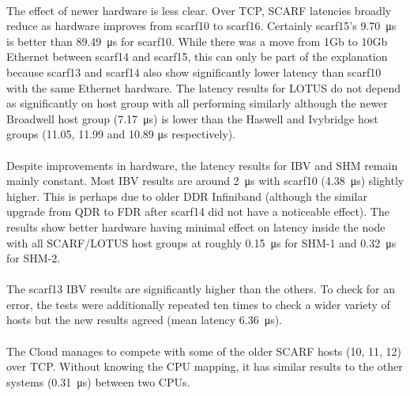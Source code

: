 \documentclass{article}
\begin{document}
            \paragraph{}
            The effect of newer hardware is less clear. Over TCP, SCARF latencies broadly reduce as hardware improves from scarf10 to scarf16. Certainly scarf15's \SI{9.70}{\micro\second} is better than \SI{89.49}{\micro\second} for scarf10. While there was a move from 1Gb to 10Gb Ethernet between scarf14 and scarf15, this can only be part of the explanation because scarf13 and scarf14 also show significantly lower latency than scarf10 with the same Ethernet hardware. The latency results for LOTUS do not depend as significantly on host group with all performing similarly although the newer Broadwell host group (\SI{7.17}{\micro\second}) is lower than the Haswell and Ivybridge host groups (11.05, 11.99 and 10.89 \si{\micro\second} respectively).

            \paragraph{}
            Despite improvements in hardware, the latency results for IBV and SHM remain mainly constant. Most IBV results are around \SI{2}{\micro\second} with scarf10 (\SI{4.38}{\micro\second}) slightly higher. This is perhaps due to older DDR Infiniband (although the similar upgrade from QDR to FDR after scarf14 did not have a noticeable effect). The results show better hardware having minimal effect on latency inside the node with all SCARF/LOTUS host groups at roughly \SI{0.15}{\micro\second} for SHM-1 and \SI{0.32}{\micro\second} for SHM-2.

            \paragraph{}
            The scarf13 IBV results are significantly higher than the others. To check for an error, the tests were additionally repeated ten times to check a wider variety of hosts but the new results agreed (mean latency \SI{6.36}{\micro\second}).

            \paragraph{}
            The Cloud manages to compete with some of the older SCARF hosts (10, 11, 12) over TCP. Without knowing the CPU mapping, it has similar results to the other systems (\SI{0.31}{\micro\second}) between two CPUs.
\end{document}

